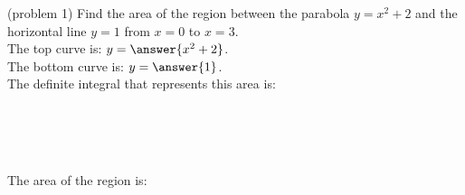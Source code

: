 \documentclass[handout]{ximera}
\begin{document}
\begin{example}[example 1]
\begin{center}
\begin{image}
\end{image}
\end{center}

\end{example}




\begin{problem}(problem 1)
Find the area of the region between the parabola $y = x^2 + 2$ and the horizontal line $y =1$ from $x = 0$ to $x = 3$.\\
The top curve is: $y = \answer{x^2 + 2}$.\\
The bottom curve is: $y = \answer{1}$.\\
The definite integral that represents this area is:
\begin{multipleChoice}
\\
\\
\\
\end{multipleChoice}

The area of the region is: 
\begin{multipleChoice}
\end{multipleChoice}

\end{problem}
\end{document}
